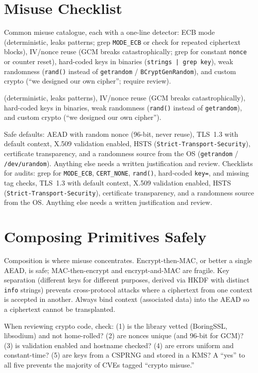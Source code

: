 \section{Misuse Checklist}
\label{sec:misuse-checklist}
Common misuse catalogue, each with a one-line detector: ECB mode (deterministic, leaks patterns; grep \texttt{MODE\_ECB} or check for repeated ciphertext blocks), IV/nonce reuse (GCM breaks catastrophically; grep for constant \texttt{nonce} or counter reset), hard-coded keys in binaries (\texttt{strings | grep key}), weak randomness (\texttt{rand()} instead of \texttt{getrandom} / \texttt{BCryptGenRandom}), and custom crypto (``we designed our own cipher''; require review).

 (deterministic, leaks patterns), IV/nonce reuse (GCM breaks catastrophically), hard-coded keys in binaries, weak randomness (\texttt{rand()} instead of \texttt{getrandom}), and custom crypto (``we designed our own cipher'').

Safe defaults: AEAD with random nonce (96-bit, never reuse), TLS~1.3 with default context, X.509 validation enabled, HSTS (\texttt{Strict-Transport-Security}), certificate transparency, and a randomness source from the OS (\texttt{getrandom} / \texttt{/dev/urandom}). Anything else needs a written justification and review. Checklists for audits: grep for \texttt{MODE\_ECB}, \texttt{CERT\_NONE}, \texttt{rand()}, hard-coded \texttt{key=}, and missing tag checks, TLS~1.3 with default context, X.509 validation enabled, HSTS (\texttt{Strict-Transport-Security}), certificate transparency, and a randomness source from the OS. Anything else needs a written justification and review.

\section{Composing Primitives Safely}
\label{sec:compose-crypto}
Composition is where misuse concentrates. Encrypt-then-MAC, or better a single AEAD, is safe; MAC-then-encrypt and encrypt-and-MAC are fragile. Key separation (different keys for different purposes, derived via HKDF with distinct \texttt{info} strings) prevents cross-protocol attacks where a ciphertext from one context is accepted in another. Always bind context (associated data) into the AEAD so a ciphertext cannot be transplanted.


\begin{remark}
When reviewing crypto code, check: (1) is the library vetted (BoringSSL, libsodium) and not home-rolled? (2) are nonces unique (and 96-bit for GCM)? (3) is validation enabled and hostname checked? (4) are errors uniform and constant-time? (5) are keys from a CSPRNG and stored in a KMS? A ``yes'' to all five prevents the majority of CVEs tagged ``crypto misuse.''
\end{remark}


